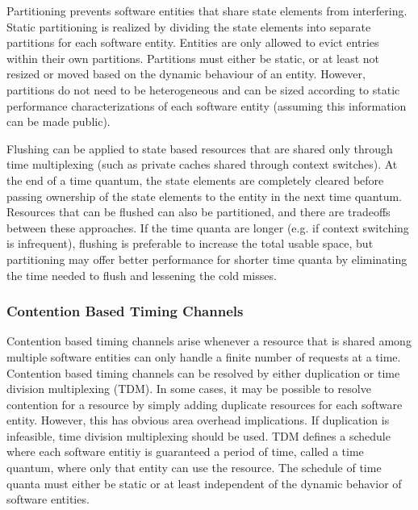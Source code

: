 Partitioning prevents software entities that share state elements from 
interfering. Static partitioning is realized by dividing the state elements 
into separate partitions for each software entity. Entities are only allowed to 
evict entries within their own partitions. Partitions must either be static, or 
at least not resized or moved based on the dynamic behaviour of an entity.
However, partitions do not need to be heterogeneous and can be sized according 
to static performance characterizations of each software entity (assuming this 
information can be made public).

Flushing can be applied to state based resources that are shared only through 
time multiplexing (such as private caches shared through context switches).  At 
the end of a time quantum, the state elements are completely cleared before 
passing ownership of the state elements to the entity in the next time quantum.  
Resources that can be flushed can also be partitioned, and there are tradeoffs 
between these approaches.
If the time quanta are longer (e.g. if context switching is infrequent), 
flushing is preferable to increase the total usable space, but partitioning may 
offer better performance for shorter time quanta by eliminating the time needed 
to flush and lessening the cold misses.

\subsubsection{Contention Based Timing Channels}
Contention based timing channels arise whenever a resource that is shared among 
multiple software entities can only handle a finite number of requests at a 
time. Contention based timing channels can be resolved by either duplication or 
time division multiplexing (TDM). In some cases, it may be possible to resolve 
contention for a resource by simply adding duplicate resources for each 
software entity. However, this has obvious area overhead implications. If 
duplication is infeasible, time division multiplexing should be used. TDM 
defines a schedule where each software entitiy is guaranteed a period of time, 
called a time quantum, where only that entity can use the resource. The 
schedule of time quanta must either be static or at least independent of the 
dynamic behavior of software entities.


